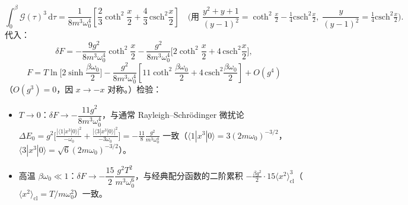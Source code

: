 \begin{equation*}
\int_0^{\beta}\mathcal{G}(\tau)^{3}\,\mathrm{d}\tau
=\frac{1}{8m^{3}\omega_0^{4}}\left[\frac{2}{3}\coth^{2}\!\frac{x}{2}+\frac{4}{3}\,\mathrm{csch}^{2}\!\frac{x}{2}\right]
\quad\Big(\text{用 }\frac{y^{2}+y+1}{(y-1)^{2}}=\coth^{2}\tfrac x2-\tfrac14\mathrm{csch}^{2}\tfrac x2,\;
\frac{y}{(y-1)^{2}}=\tfrac14\mathrm{csch}^{2}\tfrac x2\Big) .
\end{equation*}
代入：
\begin{equation*}
\delta F=-\frac{9g^{2}}{8m^{3}\omega_0^{4}}\coth^{2}\frac{x}{2}
-\frac{g^{2}}{8m^{3}\omega_0^{4}}\Big[2\coth^{2}\frac{x}{2}+4\,\mathrm{csch}^{2}\frac{x}{2}\Big] ,
\end{equation*}
\begin{equation*}
\boxed{\;F=T\ln\!\Big[2\sinh\frac{\beta\omega_0}{2}\Big]
-\frac{g^{2}}{8m^{3}\omega_0^{4}}\left[11\coth^{2}\!\frac{\beta\omega_0}{2}+4\,\mathrm{csch}^{2}\!\frac{\beta\omega_0}{2}\right]+O(g^{4})\;}
\end{equation*}
（$O(g^{3})=0$，因 $x\to-x$ 对称。）检验：
\begin{itemize}
\item $T\to0$：$\delta F\to-\dfrac{11g^{2}}{8m^{3}\omega_0^{4}}$，与通常 Rayleigh--Schr\"odinger 微扰论 $\Delta E_0=g^{2}\big[\frac{|\langle1|x^{3}|0\rangle|^{2}}{-\omega_0}+\frac{|\langle3|x^{3}|0\rangle|^{2}}{-3\omega_0}\big]=-\frac{11}{8}\frac{g^{2}}{m^{3}\omega_0^{4}}$ 一致（$\langle1|x^{3}|0\rangle=3(2m\omega_0)^{-3/2}$，$\langle3|x^{3}|0\rangle=\sqrt6(2m\omega_0)^{-3/2}$）。
\item 高温 $\beta\omega_0\ll1$：$\delta F\to-\dfrac{15}{2}\dfrac{g^{2}T^{2}}{m^{3}\omega_0^{6}}$，与经典配分函数的二阶累积 $-\frac{\beta g^{2}}{2}\cdot15\langle x^{2}\rangle_{\mathrm{cl}}^{3}$（$\langle x^{2}\rangle_{\mathrm{cl}}=T/m\omega_0^{2}$）一致。
\end{itemize}


